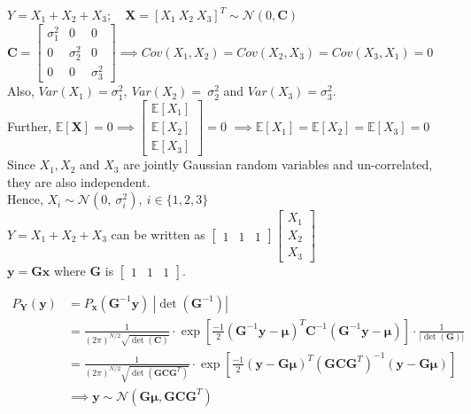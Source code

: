 \documentclass[12pt]{article}
\begin{document}
\noindent
$Y = X_1 + X_2 + X_3; \quad \mathbf{X} = [X_1 \ X_2 \ X_3]^T \sim \mathcal{N}(0, \mathbf{C})$\\

\noindent
$\mathbf{C} = \begin{bmatrix}\sigma_1^2 & 0 & 0 \\ 0 & \sigma_2^2 & 0 \\ 0 & 0 & \sigma_3^2\end{bmatrix}
\implies Cov(X_1, X_2) = Cov(X_2, X_3) = Cov(X_3, X_1) = 0$ \\[8pt]
Also, $Var(X_1) = \sigma_1^2,\ Var(X_2) =\ \sigma_2^2$ and $Var(X_3) = \sigma_3^2.$\\

\noindent
Further, $\mathbb{E}[\mathbf{X}] = 0 \implies \begin{bmatrix} \mathbb{E}[X_1] \\ \mathbb{E}[X_2] \\ \mathbb{E}[X_3] \end{bmatrix} = 0$
$\implies \mathbb{E}[X_1] = \mathbb{E}[X_2] = \mathbb{E}[X_3] = 0$\\[8pt]
\noindent
Since $X_1, X_2$ and $X_3$ are jointly Gaussian random variables and un-correlated, they are also independent.\\[8pt]
Hence, $X_i \sim \mathcal{N}(0,\ \sigma_i^2), \ i \in \{1, 2, 3\}$\\[8pt]
$Y = X_1 + X_2 + X_3$ can be written as $\begin{bmatrix} 1 & 1 & 1 \end{bmatrix} \begin{bmatrix} X_1 \\ X_2 \\ X_3 \end{bmatrix}$\\[8pt]

\noindent
$\mathbf{y} = \mathbf{G}\mathbf{x}$ where $\mathbf{G}$ is $\begin{bmatrix} 1 & 1 & 1 \end{bmatrix}$.

\begin{align*}
  P_{\mathbf{Y}}(\mathbf{y}) &= P_{\mathbf{x}}(\mathbf{G}^{-1}\mathbf{y}) \ |\det(\mathbf{G}^{-1})| \\[8pt]
  &= \frac{1}{(2\pi)^{N/2} \sqrt{\det(\mathbf{C})}} \cdot \exp \left[ \frac{-1}{2} (\mathbf{G}^{-1}\mathbf{y} - \bm{\mu})^T \mathbf{C}^{-1} (\mathbf{G}^{-1}\mathbf{y} - \bm{\mu}) \right] \cdot \frac{1}{|\det(\mathbf{G})|} \\[8pt]
  &= \frac{1}{(2\pi)^{N/2} \sqrt{\det(\mathbf{GCG}^T)}} \cdot \exp \left[ \frac{-1}{2} (\mathbf{y} - \mathbf{G\bm{\mu}})^T (\mathbf{GCG}^T)^{-1} (\mathbf{y} - \mathbf{G\bm{\mu}}) \right] \\[8pt]
  &\implies \mathbf{y} \sim \mathcal{N}(\mathbf{G\bm{\mu}}, \mathbf{GCG}^T)
\end{align*}
\end{document}
